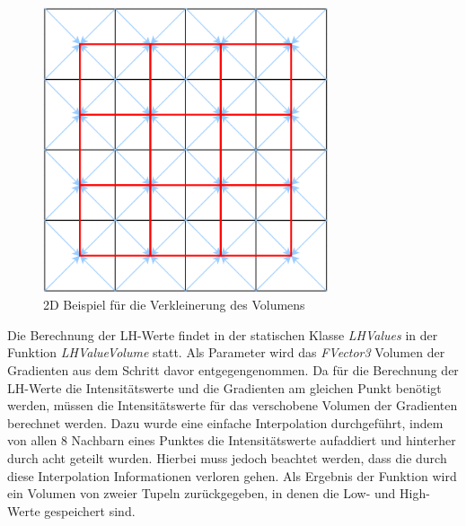 \begin{figure}
\centering 
\includegraphics[width=0.75\textwidth]{Logos/VoxelShift.png}
\caption{2D Beispiel für die Verkleinerung des Volumens} 
\label{fig:shift} 
\end{figure}


Die Berechnung der LH-Werte findet in der statischen Klasse \textit{LHValues} in der Funktion \textit{LHValueVolume} statt. Als Parameter wird das \textit{FVector3} Volumen der Gradienten aus dem Schritt davor entgegengenommen.
Da für die Berechnung der LH-Werte die Intensitätswerte und die Gradienten am gleichen Punkt benötigt werden, müssen die Intensitätswerte für das verschobene Volumen der Gradienten berechnet werden. Dazu wurde eine einfache Interpolation durchgeführt, indem von allen 8 Nachbarn eines Punktes die Intensitätswerte aufaddiert und hinterher durch acht geteilt wurden. Hierbei muss jedoch beachtet werden, dass die durch diese Interpolation Informationen verloren gehen.
\newline
Als Ergebnis der Funktion wird ein Volumen von zweier Tupeln zurückgegeben, in denen die Low- und High-Werte gespeichert sind.


